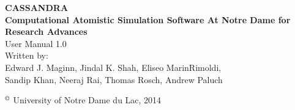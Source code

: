 \begin{center}
\vspace*{2 in}
{\huge{\bf CASSANDRA} }\\ 
\vspace{0.5in}
{\huge { \bf  Computational Atomistic Simulation Software At Notre Dame for Research Advances}} \\
\vspace{1 in}
User Manual 1.0 \\ 
\vspace{0.2in}
Written by: \\ 
\vspace{0.2in}
Edward J. Maginn, Jindal K. Shah, Eliseo MarinRimoldi, \\
Sandip Khan, Neeraj Rai, Thomas Rosch, Andrew Paluch
\end{center}
\vspace{1.5in}
$^\copyright$ University of Notre Dame du Lac, 2014
